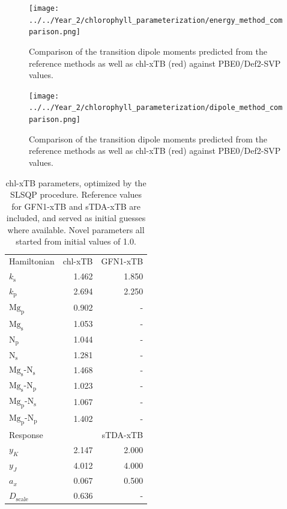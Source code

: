 \begin{figure}
    \centering
    \texttt{[image: ../../Year\_2/chlorophyll\_parameterization/energy\_method\_comparison.png]}
    \caption{Comparison of the \Qy transition dipole moments predicted from the
    reference methods as well as chl-xTB (red) against PBE0/Def2-SVP values.}
    \label{fig:dipole_training_scatter}
\end{figure}

\begin{figure}
    \centering
    \texttt{[image: ../../Year\_2/chlorophyll\_parameterization/dipole\_method\_comparison.png]}
    \caption{Comparison of the \Qy transition dipole moments predicted from the
    reference methods as well as chl-xTB (red) against PBE0/Def2-SVP values.}
    \label{fig:dipole_training_scatter}
\end{figure}

\begin{table}
    \centering
    \begin{tabular}{|| l r | r ||}
    \hline
    Hamiltonian & chl-xTB & GFN1-xTB \\
    $k_\text{s}$ & 1.462 & 1.850 \\
    $k_\text{p}$ & 2.694 & 2.250 \\

    $\text{Mg}_\text{p}$ & 0.902 & - \\
    $\text{Mg}_\text{s}$ & 1.053 & - \\
    $\text{N}_\text{p}$ & 1.044 & - \\
    $\text{N}_\text{s}$ & 1.281 & - \\

    $\text{Mg}_\text{s}$-$\text{N}_\text{s}$ & 1.468 & - \\
    $\text{Mg}_\text{s}$-$\text{N}_\text{p}$ & 1.023 & - \\
    $\text{Mg}_\text{p}$-$\text{N}_\text{s}$ & 1.067 & - \\
    $\text{Mg}_\text{p}$-$\text{N}_\text{p}$ & 1.402 & - \\

    \hline\hline
    Response & & sTDA-xTB\\
    $y_K$ & 2.147 & 2.000 \\
    $y_J$ & 4.012 & 4.000 \\
    $a_x$ & 0.067 & 0.500 \\
    $D_{\text{scale}}$ & 0.636 & - \\
    \hline
    \end{tabular}
    \caption{chl-xTB parameters, optimized by the SLSQP procedure. Reference values
    for GFN1-xTB and sTDA-xTB are included, and served as initial guesses where 
    available. Novel parameters all started from initial values of 1.0.}
    \label{table:chl_params}
\end{table}


